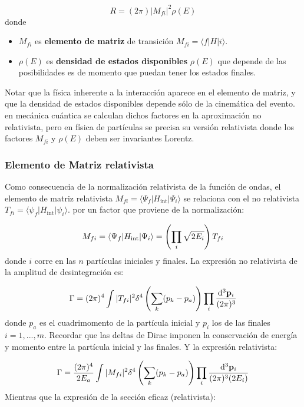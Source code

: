 \begin{equation}
	R=(2\pi) |M_{fi}|^2 \rho (E)
\end{equation}
donde 

\begin{itemize}
	\item $M_{fi}$ es \textbf{elemento de matriz} de transición $M_{fi}=\langle f |H|i\rangle$.
	\item $\rho(E)$ es \textbf{densidad de estados disponibles} $\rho(E)$ que depende de las posibilidades es de momento que puedan tener los estados finales.
\end{itemize}
Notar que la física inherente a la interacción aparece en el elemento de matriz, y que la densidad de estados disponibles depende sólo de la cinemática del evento. en mecánica cuántica se calculan dichos factores en la aproximación no relativista, pero en física de partículas se precisa su versión relativista donde los factores $M_{fi}$ y $\rho(E)$ deben ser invariantes Lorentz.


\subsubsection{Elemento de Matriz relativista}

Como consecuencia de la normalización relativista de la función de ondas, el elemento de matriz relativista $M_{fi}=\langle \Psi_f |H_{\text{int}}| \Psi_i \rangle$ se relaciona con el no relativista $T_{fi}=\langle \psi_f |H_{\text{int}}|\psi_i\rangle$. por un factor que proviene de la normalización:

\begin{equation}
	M_{fi} = \langle \Psi_f |H_{\text{int}}| \Psi_i \rangle  = \left( \prod_i \sqrt{2E_i} \right) T_{fi}
\end{equation}
donde $i$ corre en las $n$ partículas iniciales y finales. La expresión no relativista de la amplitud de desintegración es:

\begin{equation}
	\Gamma = (2\pi)^4 \int |T_{fi}|^2 \delta^4 \left( \sum_k (p_k-p_a) \right)\prod_i \frac{\mathrm{d}^3 \mathbf{p}_i}{(2\pi)^3}
\end{equation}
donde $p_a$ es el cuadrimomento de la partícula inicial y $p_i$ los de las finales $i=1,...,m$. Recordar que las deltas de Dirac imponen la conservación de energía y momento entre la partícula inicial y las finales. Y la expresión relativista:

\begin{equation}
	\Gamma = \frac{(2\pi)^4}{2E_a} \int |M_{fi}|^2 \delta^4 \left( \sum_k (p_k-p_a) \right)\prod_i \frac{\mathrm{d}^3 \mathbf{p}_i}{(2\pi)^3(2E_i)}
\end{equation}
Mientras que la expresión de la sección eficaz (relativista):

